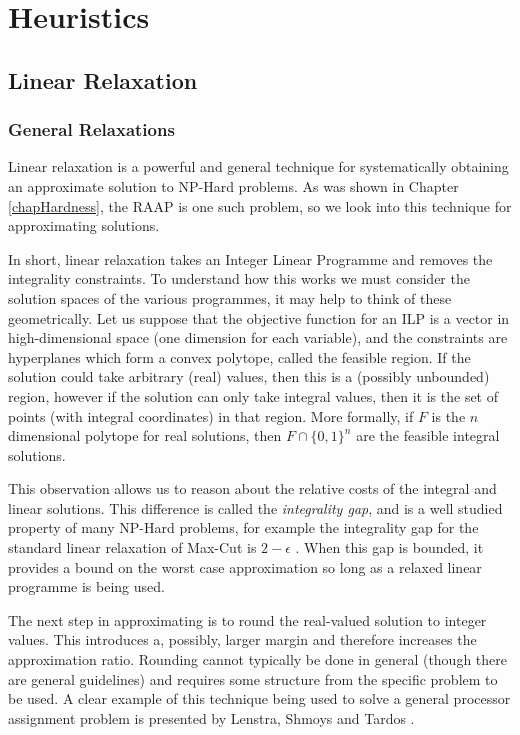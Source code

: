 \chapter{Heuristics}
\label{chapAlgos}

\section{Linear Relaxation}

\subsection{General Relaxations}
\label{secAlgRelax}

Linear relaxation is a powerful and general technique for systematically obtaining an approximate solution to NP-Hard problems.
As was shown in Chapter \ref{chapHardness}, the RAAP is one such problem, so we look into this technique for approximating solutions.

In short, linear relaxation takes an Integer Linear Programme and removes the integrality constraints.
To understand how this works we must consider the solution spaces of the various programmes, it may help to think of these geometrically.
Let us suppose that the objective function for an ILP is a vector in high-dimensional space (one dimension for each variable), and the constraints are hyperplanes which form a convex polytope, called the feasible region.
If the solution could take arbitrary (real) values, then this is a (possibly unbounded) region, however if the solution can only take integral values, then it is the set of points (with integral coordinates) in that region.
More formally, if $F$ is the $n$ dimensional polytope for real solutions, then $F \cap \{0,1\}^n$ are the feasible integral solutions. %

This observation allows us to reason about the relative costs of the integral and linear solutions.
This difference is called the {\em integrality gap}, and is a well studied property of many NP-Hard problems, for example the integrality gap for the standard linear relaxation of Max-Cut is $2-\epsilon$ \cite{fer07}.
When this gap is bounded, it provides a bound on the worst case approximation so long as a relaxed linear programme is being used.

The next step in approximating is to round the real-valued solution to integer values.
This introduces a, possibly, larger margin and therefore increases the approximation ratio.
Rounding cannot typically be done in general (though there are general guidelines) and requires some structure from the specific problem to be used.
A clear example of this technique being used to solve a general processor assignment problem is presented by Lenstra, Shmoys and Tardos \cite{len87}.

